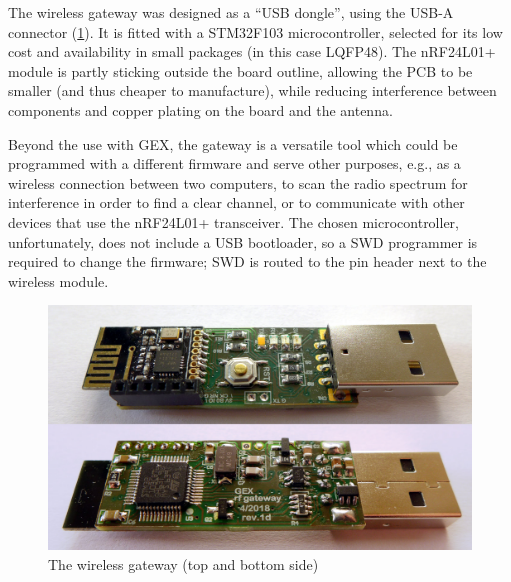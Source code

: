 The wireless gateway was designed as a ``\gls{USB} dongle'', using the USB-A connector (\cref{fig:gwxgw}). It is fitted with a STM32F103 microcontroller, selected for its low cost and availability in small packages (in this case LQFP48). The nRF24L01+ module is partly sticking outside the board outline, allowing the \gls{PCB} to be smaller (and thus cheaper to manufacture), while reducing interference between components and copper plating on the board and the antenna.

Beyond the use with GEX, the gateway is a versatile tool which could be programmed with a different firmware and serve other purposes, e.g., as a wireless connection between two computers, to scan the radio spectrum for interference in order to find a clear channel, or to communicate with other devices that use the nRF24L01+ transceiver. The chosen microcontroller, unfortunately, does not include a USB bootloader, so a SWD programmer is required to change the firmware; SWD is routed to the pin header next to the wireless module.

\begin{figure}[h]
	\centering
	\includegraphics[width=.9\textwidth]{img/photo-rfdongle.jpg}
	\caption{\label{fig:gwxgw}The wireless gateway (top and bottom side)}
\end{figure}
